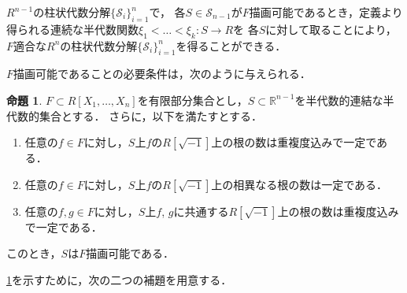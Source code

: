 \documentclass[uplatex, dvipdfmx]{jsarticle}
\newcommand{\R}{\mathbb{R}}
\newcommand{\calS}{\mathcal{S}}
\newcommand{\map}[3]{{#1}:{#2}\rightarrow{#3}}
\theoremstyle{definition}
\newtheorem{proposition}{命題}[section]
\begin{document}
$R^{n-1}$の柱状代数分解$\{\calS_i\}_{i=1}^n$で，
各$S \in \calS_{n-1}$が$F$描画可能であるとき，定義より得られる連続な半代数関数$\map{\xi_1<\dots<\xi_k}{S}{R}$を
各$S$に対して取ることにより，$F$適合な$R^n$の柱状代数分解$\{\calS_i\}_{i=1}^n$を得ることができる．

$F$描画可能であることの必要条件は，次のように与えられる．

\begin{proposition}\label{proposition:del}
     $F \subset R[X_1, \dots, X_n]$を有限部分集合とし，$S \subset \R^{n-1}$を半代数的連結な半代数的集合とする．
     さらに，以下を満たすとする．
     \begin{enumerate}
          \item 任意の$f \in F$に対し，$S$上$f$の$R[\sqrt{-1}]$上の根の数は重複度込みで一定である．
          \item 任意の$f \in F$に対し，$S$上$f$の$R[\sqrt{-1}]$上の相異なる根の数は一定である．
          \item 任意の$f, g \in F$に対し，$S$上$f$, $g$に共通する$R[\sqrt{-1}]$上の根の数は重複度込みで一定である．
     \end{enumerate}
     このとき，$S$は$F$描画可能である．
\end{proposition}

\cref{proposition:del}を示すために，次の二つの補題を用意する．
\end{document}
